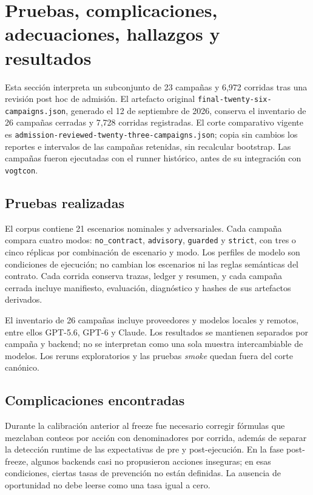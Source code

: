 \section{Pruebas, complicaciones, adecuaciones, hallazgos y resultados}

\lettrine[lines=2,nindent=0pt]{E}{}sta secci\'on interpreta un subconjunto de 23 campa\~nas y 6,972 corridas tras una revisi\'on post hoc de admisi\'on. El artefacto original \texttt{final-twenty-six-campaigns.json}, generado el 12 de septiembre de 2026, conserva el inventario de 26 campa\~nas cerradas y 7,728 corridas registradas. El corte comparativo vigente es \texttt{admission-reviewed-twenty-three-campaigns.json}; copia sin cambios los reportes e intervalos de las campa\~nas retenidas, sin recalcular bootstrap. Las campa\~nas fueron ejecutadas con el runner hist\'orico, antes de su integraci\'on con \texttt{vogtcon}.

\subsection{Pruebas realizadas}
El corpus contiene 21 escenarios nominales y adversariales. Cada campa\~na compara cuatro modos: \texttt{no\_contract}, \texttt{advisory}, \texttt{guarded} y \texttt{strict}, con tres o cinco r\'eplicas por combinaci\'on de escenario y modo. Los perfiles de modelo son condiciones de ejecuci\'on; no cambian los escenarios ni las reglas sem\'anticas del contrato. Cada corrida conserva trazas, ledger y resumen, y cada campa\~na cerrada incluye manifiesto, evaluaci\'on, diagn\'ostico y hashes de sus artefactos derivados.

El inventario de 26 campa\~nas incluye proveedores y modelos locales y remotos, entre ellos GPT-5.6, GPT-6 y Claude. Los resultados se mantienen separados por campa\~na y backend; no se interpretan como una sola muestra intercambiable de modelos. Los reruns exploratorios y las pruebas \textit{smoke} quedan fuera del corte can\'onico.

\subsection{Complicaciones encontradas}
Durante la calibraci\'on anterior al freeze fue necesario corregir f\'ormulas que mezclaban conteos por acci\'on con denominadores por corrida, adem\'as de separar la detecci\'on runtime de las expectativas de pre y post-ejecuci\'on. En la fase post-freeze, algunos backends casi no propusieron acciones inseguras; en esas condiciones, ciertas tasas de prevenci\'on no est\'an definidas. La ausencia de oportunidad no debe leerse como una tasa igual a cero.


